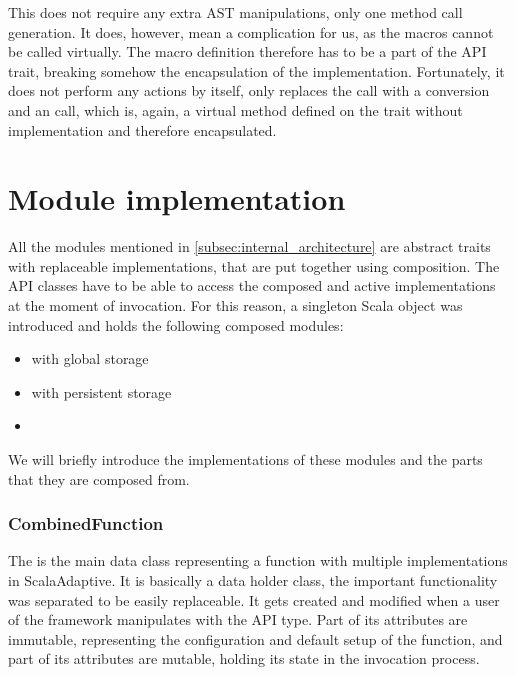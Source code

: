 This does not require any extra AST manipulations, only one method call generation. It does, however, mean a complication for us, as the macros cannot be called virtually. The macro definition therefore has to be a part of the  API trait, breaking somehow the encapsulation of the implementation. Fortunately, it does not perform any actions by itself, only replaces the  call with a conversion and an  call, which is, again, a virtual method defined on the trait without implementation and therefore encapsulated.


\section{Module implementation}
\label{sec:module_impl}

All the modules mentioned in \ref{subsec:internal_architecture} are abstract traits with replaceable implementations, that are put together using composition. The API classes have to be able to access the composed and active implementations at the moment of invocation. For this reason, a singleton Scala object  was introduced and holds the following composed modules:

\begin{itemize}
	\item {} with global storage
	\item {} with persistent storage
	\item {}
\end{itemize}

We will briefly introduce the implementations of these modules and the parts that they are composed from.

\subsubsection{CombinedFunction}

The  is the main data class representing a function with multiple implementations in ScalaAdaptive. It is basically a data holder class, the important functionality was separated to be easily replaceable. It gets created and modified when a user of the framework manipulates with the  API type. Part of its attributes are immutable, representing the configuration and default setup of the function, and part of its attributes are mutable, holding its state in the invocation process.

